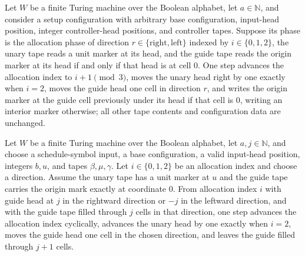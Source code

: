 \begin{lemma}
\label{Complexity.setupCfg_layout_step}
\leanok
{}
Let $W$ be a finite Turing machine over the Boolean alphabet, let $a\in\mathbb{N}$, and
consider a setup configuration with arbitrary base configuration, input-head position,
integer controller-head positions, and controller tapes. Suppose its phase is the
allocation phase of direction $r\in\{\mathrm{right},\mathrm{left}\}$ indexed by
$i\in\{0,1,2\}$, the unary tape reads a unit marker at its head, and the guide tape
reads the origin marker at its head if and only if that head is at cell $0$. One step
advances the allocation index to $i+1\pmod 3$, moves the unary head right by one exactly
when $i=2$, moves the guide head one cell in direction $r$, and writes the origin marker
at the guide cell previously under its head if that cell is $0$, writing an interior
marker otherwise; all other tape contents and configuration data are unchanged.
\end{lemma}

\begin{lemma}
\label{Complexity.setupCfg_layout_fill}
\leanok
{}
Let $W$ be a finite Turing machine over the Boolean alphabet, let $a,j\in\mathbb{N}$,
and choose a schedule-symbol input, a base configuration, a valid input-head position,
integers $b,u$, and tapes $\beta,\mu,\gamma$. Let $i\in\{0,1,2\}$ be an allocation index
and choose a direction. Assume the unary tape has a unit marker at $u$ and the guide
tape carries the origin mark exactly at coordinate $0$. From allocation index $i$ with
guide head at $j$ in the rightward direction or $-j$ in the leftward direction, and with
the guide tape filled through $j$ cells in that direction, one step advances the
allocation index cyclically, advances the unary head by one exactly when $i=2$, moves
the guide head one cell in the chosen direction, and leaves the guide filled through
$j+1$ cells.
\end{lemma}

